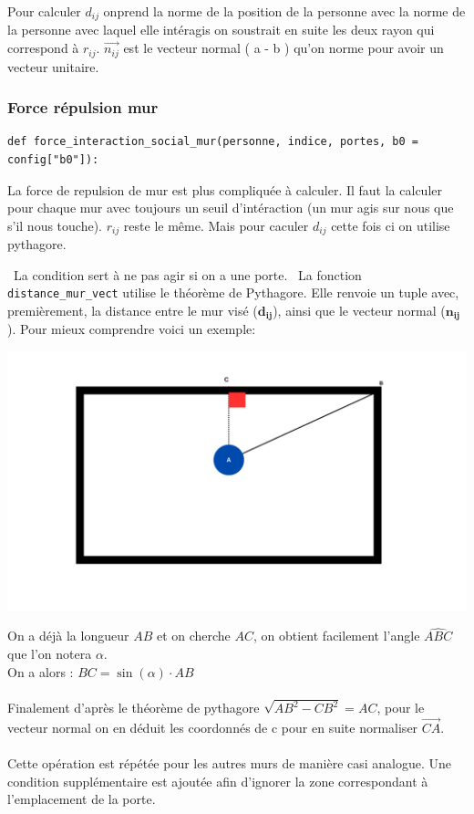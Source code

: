 \documentclass[a4paper,12pt]{article}
\begin{document}
Pour calculer $d_{ij}$ onprend la norme de la position de la personne avec la norme de la personne avec laquel elle intéragis on soustrait en suite les deux rayon qui correspond à $r_{ij}$. $\vec{n_{ij}}$ est le vecteur normal ( a - b ) qu'on norme pour avoir un vecteur unitaire. 


\subsubsection{Force répulsion mur}

\begin{verbatim}
def force_interaction_social_mur(personne, indice, portes, b0 = config["b0"]):
\end{verbatim}

La force de repulsion de mur est plus compliquée à calculer. Il faut la calculer pour chaque mur avec toujours un seuil d'intéraction (un mur agis sur nous que s'il nous touche). \textbf{$r_{ij}$} reste le même. Mais pour caculer \textbf{$d_{ij}$} cette fois ci on utilise pythagore.

\
La condition sert à ne pas agir si on a une porte.
\
La fonction \texttt{distance\_mur\_vect} utilise le théorème de Pythagore. Elle renvoie un tuple avec, premièrement, la distance entre le mur visé ($\mathbf{d_{ij}}$), ainsi que le vecteur normal ($\mathbf{n_{ij}}$). Pour mieux comprendre voici un exemple:

\includegraphics[width=\textwidth]{explication.png}

On a déjà la longueur \( AB \) et on cherche \( AC \), on obtient facilement l'angle \( \widehat{ABC} \) que l'on notera \( \alpha \). \\
On a alors : \( BC = \sin(\alpha) \cdot AB \)
\\
\\
Finalement d'après le théorème de pythagore $\sqrt{AB^2 - CB^2} = AC$, pour le vecteur normal on en déduit les coordonnés de c pour en suite normaliser $\vec{CA}$.
\\
\\
\indent Cette opération est répétée pour les autres murs de manière casi analogue. Une condition supplémentaire est ajoutée afin d’ignorer la zone correspondant à l’emplacement de la porte.
\end{document}
